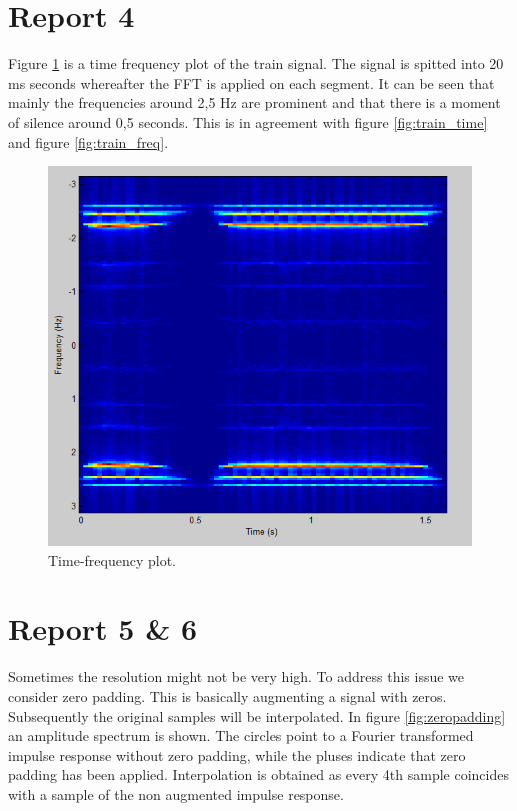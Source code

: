 \documentclass[final]{scrreprt} %
\begin{document}
\section*{Report 4}

Figure \ref{fig:timefreq} is a time frequency plot of the train signal. 
The signal is spitted into 20 ms seconds whereafter the FFT is applied on each segment.
It can be seen that mainly the frequencies around 2,5 Hz are prominent and that there is a moment of silence around 0,5 seconds. 
This is in agreement with figure \ref{fig:train_time} and figure \ref{fig:train_freq}.

\begin{figure}[H]
\centering
\includegraphics[scale = 0.7]{resources/labday1_report4_timefrequency.png}
\caption{Time-frequency plot.}
\label{fig:timefreq}
\end{figure}

\section*{Report 5 \& 6}

Sometimes the resolution might not be very high. 
To address this issue we consider zero padding.
This is basically augmenting a signal with zeros.
Subsequently the original samples will be interpolated.
In figure \ref{fig:zeropadding} an amplitude spectrum is shown.
The circles point to a Fourier transformed impulse response without zero padding, while the pluses indicate that zero padding has been applied.
Interpolation is obtained as every 4th sample coincides with a sample of the non augmented impulse response.
\end{document}
